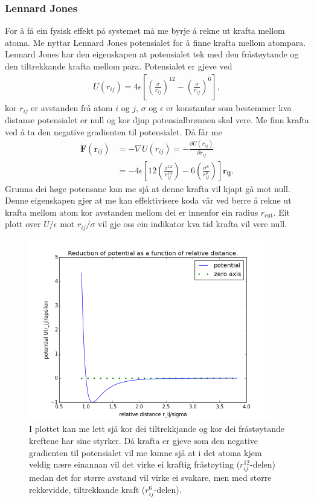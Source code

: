 \documentclass[12pt, a4paper]{article}
\theoremstyle{definition}
\newcommand{\vb}{\mathbf}
\begin{document}
        \subsubsection*{Lennard Jones}
            For å få ein fysisk effekt på systemet må me byrje å rekne ut krafta mellom atoma. Me nyttar Lennard Jones potensialet for å finne krafta mellom atompara.
            Lennard Jones har den eigenskapen at potensialet tek med den fråstøytande og den tiltrekkande krafta mellom para. Potensialet er gjeve ved
            \begin{align*}
                U(r_{ij}) = 4\epsilon\left[ \left( \frac{\sigma}{r_{ij}} \right)^{12} - \left( \frac{\sigma}{r_{ij}} \right)^{6} \right],
            \end{align*}
            kor $r_{ij}$ er avstanden frå atom $i$ og $j$, $\sigma$ og $\epsilon$ er konstantar som bestemmer kva distanse potensialet er null og kor djup potensialbrønnen skal vere.
            Me finn krafta ved å ta den negative gradienten til potensialet. Då får me
            \begin{align*}
                \vb{F}(\vb{r}_{ij}) &= -\nabla U(r_{ij}) = -\frac{\partial U(r_{ij})}{\partial r_{ij}} \\
                &= -4\epsilon\left[ 12\left( \frac{\sigma^{12}}{r_{ij}^{14}} \right) - 6\left( \frac{\sigma^6}{r_{ij}^8} \right) \right]\vb{r_{ij}}.
            \end{align*}
            Grunna dei høge potensane kan me sjå at denne krafta vil kjapt gå mot null. Denne eigenskapen gjer at me kan effektivisere koda vår ved berre å rekne ut krafta 
            mellom atom kor avstanden mellom dei er innenfor ein radius $r_{\text{cut}}$.
            Eit plott over $U/\epsilon$ mot $r_{ij}/\sigma$ vil gje oss ein indikator kva tid krafta vil vere null.
            \begin{figure}[H]
                \centering
                \includegraphics[width=400px]{potentialPlot.png}
                \caption{I plottet kan me lett sjå kor dei tiltrekkjande og kor dei fråstøytande kreftene har sine styrker. Då krafta er gjeve som den negative gradienten til
                        potensialet vil me kunne sjå at i det atoma kjem veldig nære einannan vil det virke ei kraftig fråstøyting ($r_{ij}^{12}$-delen) medan det for større avstand
                        vil virke ei svakare, men med større rekkevidde, tiltrekkande kraft ($r_{ij}^6$-delen).}
            \end{figure}
\end{document}
